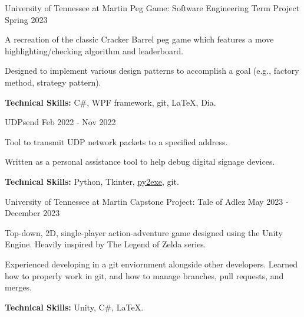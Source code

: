 
\begin{cventries}

	\cventry
		{University of Tennessee at Martin}
		{Peg Game: Software Engineering Term Project}
		{}
		{Spring 2023}
		{
		\begin{cvitems}
			\item A recreation of the classic Cracker Barrel peg game which features a move highlighting/checking algorithm and leaderboard.
			\item Designed to implement various design patterns to accomplish a goal (e.g., factory method, strategy pattern).
			\item \textbf{Technical Skills:} C\#, WPF framework, git, \LaTeX, Dia.
		\end{cvitems}
		}
		
	\cventry
		{}
		{UDPsend}
		{}
		{Feb 2022 - Nov 2022}
		{
		\vspace{-1.5em}
		\begin{cvitems}
			\item Tool to transmit UDP network packets to a specified address.
			\item Written as a personal assistance tool to help debug digital signage devices.
			\item \textbf{Technical Skills:} Python, Tkinter, \href{https://www.py2exe.org/}{py2exe}, git.
		\end{cvitems}
		}	
		
	\cventry
		{University of Tennessee at Martin}
		{Capstone Project: Tale of Adlez}
		{}
		{May 2023 - December 2023}
		{
		\begin{cvitems}
			\item Top-down, 2D, single-player action-adventure game designed using the Unity Engine. Heavily inspired by The Legend of Zelda series.
			\item Experienced developing in a git enviornment alongside other developers. Learned how to properly work in git, and how to manage branches, pull requests, and merges.
			\item \textbf{Technical Skills:} Unity, C\#, \LaTeX.
		\end{cvitems}
		}		

		



\end{cventries}
